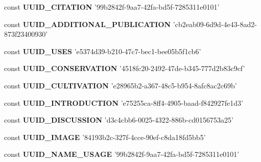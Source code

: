 \begin{DoxyCompactItemize}
\item 
\hypertarget{uuids_8php_a5f0ce3cc98162e05d0898dd88d0a50cf}{const {\bfseries U\-U\-I\-D\-\_\-\-C\-I\-T\-A\-T\-I\-O\-N} '99b2842f-\/9aa7-\/42fa-\/bd5f-\/7285311e0101'}\label{uuids_8php_a5f0ce3cc98162e05d0898dd88d0a50cf}

\item 
\hypertarget{uuids_8php_ab795fef0ee8818ab55f2cefec1881aaa}{const {\bfseries U\-U\-I\-D\-\_\-\-A\-D\-D\-I\-T\-I\-O\-N\-A\-L\-\_\-\-P\-U\-B\-L\-I\-C\-A\-T\-I\-O\-N} 'cb2eab09-\/6d9d-\/4e43-\/8ad2-\/873f23400930'}\label{uuids_8php_ab795fef0ee8818ab55f2cefec1881aaa}

\item 
\hypertarget{uuids_8php_ad469d15cb3d566b637c35a2e04836d2a}{const {\bfseries U\-U\-I\-D\-\_\-\-U\-S\-E\-S} 'e5374d39-\/b210-\/47c7-\/bec1-\/bee05b5f1cb6'}\label{uuids_8php_ad469d15cb3d566b637c35a2e04836d2a}

\item 
\hypertarget{uuids_8php_ad08081eb40f5331c3cd7e3a63f7dc854}{const {\bfseries U\-U\-I\-D\-\_\-\-C\-O\-N\-S\-E\-R\-V\-A\-T\-I\-O\-N} '4518fc20-\/2492-\/47de-\/b345-\/777d2b83c9cf'}\label{uuids_8php_ad08081eb40f5331c3cd7e3a63f7dc854}

\item 
\hypertarget{uuids_8php_a731ff71cccc8034e25724ff3c6543468}{const {\bfseries U\-U\-I\-D\-\_\-\-C\-U\-L\-T\-I\-V\-A\-T\-I\-O\-N} 'e28965b2-\/a367-\/48c5-\/b954-\/8afc8ac2c69b'}\label{uuids_8php_a731ff71cccc8034e25724ff3c6543468}

\item 
\hypertarget{uuids_8php_a864b23ca154a9992c757a6c7afca2c16}{const {\bfseries U\-U\-I\-D\-\_\-\-I\-N\-T\-R\-O\-D\-U\-C\-T\-I\-O\-N} 'e75255ca-\/8ff4-\/4905-\/baad-\/f842927fe1d3'}\label{uuids_8php_a864b23ca154a9992c757a6c7afca2c16}

\item 
\hypertarget{uuids_8php_a3316db3f2efcb8f84bf24f72a39098a9}{const {\bfseries U\-U\-I\-D\-\_\-\-D\-I\-S\-C\-U\-S\-S\-I\-O\-N} 'd3c4cbb6-\/0025-\/4322-\/886b-\/cd0156753a25'}\label{uuids_8php_a3316db3f2efcb8f84bf24f72a39098a9}

\item 
\hypertarget{uuids_8php_a174560080c04aee83a7b98a9e7557e26}{const {\bfseries U\-U\-I\-D\-\_\-\-I\-M\-A\-G\-E} '84193b2c-\/327f-\/4cce-\/90ef-\/c8da18fd5bb5'}\label{uuids_8php_a174560080c04aee83a7b98a9e7557e26}

\item 
\hypertarget{uuids_8php_a82359284171d1ac1c3511527fff103b2}{const {\bfseries U\-U\-I\-D\-\_\-\-N\-A\-M\-E\-\_\-\-U\-S\-A\-G\-E} '99b2842f-\/9aa7-\/42fa-\/bd5f-\/7285311e0101'}\label{uuids_8php_a82359284171d1ac1c3511527fff103b2}


\end{DoxyCompactItemize}
